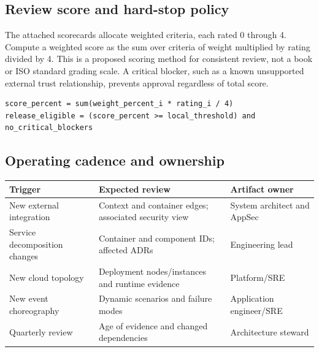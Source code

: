 \documentclass[10pt,letterpaper]{article}
\begin{document}
\subsection{Review score and hard-stop policy}
The attached scorecards allocate weighted criteria, each rated 0 through 4. Compute a weighted score as the sum over criteria of weight multiplied by rating divided by 4. This is a proposed scoring method for consistent review, not a book or ISO standard grading scale. A critical blocker, such as a known unsupported external trust relationship, prevents approval regardless of total score.

\begin{lstlisting}
score_percent = sum(weight_percent_i * rating_i / 4)
release_eligible = (score_percent >= local_threshold) and no_critical_blockers
\end{lstlisting}
\subsection{Operating cadence and ownership}
\begin{tabularx}{\linewidth}{@{}YYY@{}}\toprule
\textbf{Trigger} & \textbf{Expected review} & \textbf{Artifact owner} \\ \midrule
New external integration & Context and container edges; associated security view & System architect and AppSec \\
Service decomposition changes & Container and component IDs; affected ADRs & Engineering lead \\
New cloud topology & Deployment nodes/instances and runtime evidence & Platform/SRE \\
New event choreography & Dynamic scenarios and failure modes & Application engineer/SRE \\
Quarterly review & Age of evidence and changed dependencies & Architecture steward \\
\bottomrule\end{tabularx}
\end{document}
